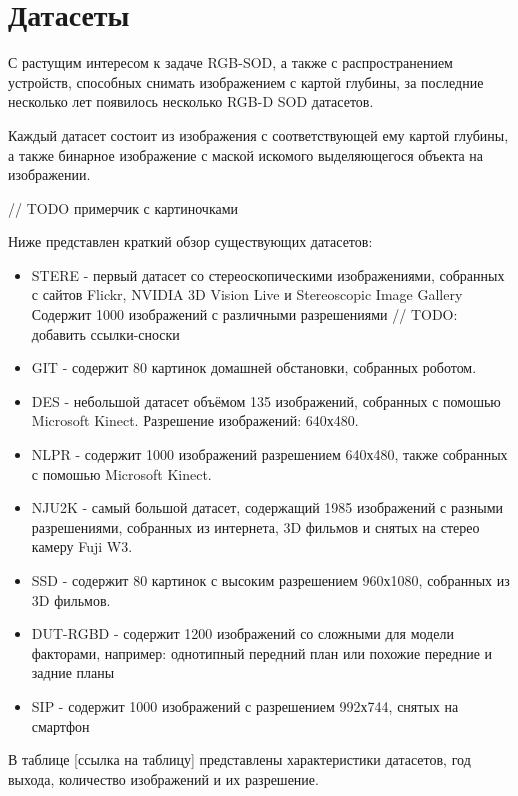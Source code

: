 \section{Датасеты}

С растущим интересом к задаче RGB-SOD, а также с распространением устройств, способных 
снимать изображением с картой глубины, за последние несколько лет появилось несколько RGB-D SOD датасетов.

Каждый датасет состоит из изображения с соответствующей ему картой глубины, а также
бинарное изображение с маской искомого выделяющегося объекта на изображении.


// TODO примерчик с картиночками

Ниже представлен краткий обзор существующих датасетов:
\begin{itemize}
    \item STERE \cite{STERE} - первый датасет со стереоскопическими изображениями, собранных с сайтов Flickr, NVIDIA 3D Vision Live и Stereoscopic Image Gallery
    Содержит 1000 изображений с различными разрешениями // TODO: добавить ссылки-сноски
    \item GIT \cite{GIT} - содержит 80 картинок домашней обстановки, собранных роботом.
    \item DES \cite{DES} - небольшой датасет объёмом 135 изображений, собранных с помошью Microsoft Kinect. Разрешение изображений: 640х480.
    \item NLPR \cite{NLPR} - содержит 1000 изображений разрешением 640х480, также собранных с помошью Microsoft Kinect.
    \item NJU2K \cite{NJU2K} - самый большой датасет, содержащий 1985 изображений с разными разрешениями, собранных из интернета, 3D фильмов и снятых на стерео камеру Fuji W3.
    \item SSD \cite{SSD} - содержит 80 картинок с высоким разрешением 960х1080, собранных из 3D фильмов.
    \item DUT-RGBD \cite{DUT} - содержит 1200 изображений со сложными для модели факторами, например: однотипный передний план или похожие передние и задние планы
    \item SIP \cite{Rethinking-RGBD} - содержит 1000 изображений с разрешением 992х744, снятых на смартфон
\end{itemize}

В таблице [ссылка на таблицу] представлены характеристики датасетов, год выхода, количество изображений и их разрешение.
